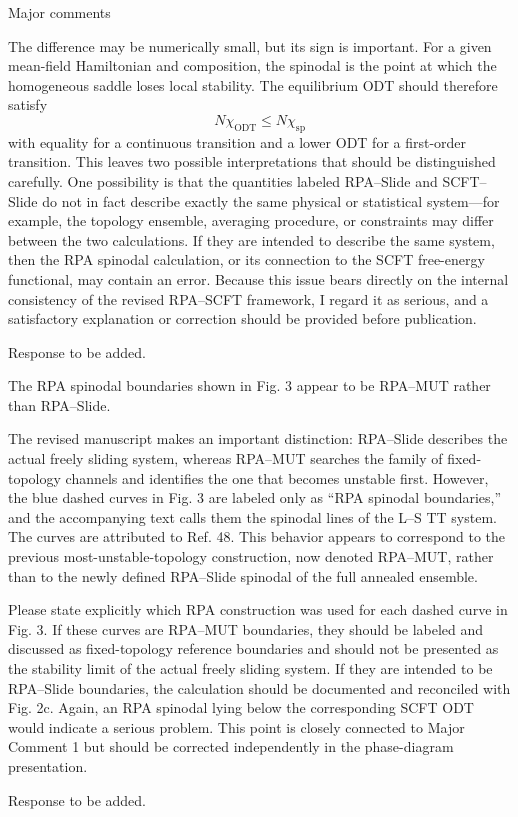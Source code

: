 \documentclass[../ResponsetoReviewers.tex]{subfiles}
\begin{document}
\begin{reviewersection}
\begin{reviewergroup}{Major comments}
\begin{qa}
    The difference may be numerically small, but its sign is important.
    For a given mean-field Hamiltonian and composition, the spinodal is the point at which the homogeneous saddle loses local stability.
    The equilibrium ODT should therefore satisfy
    \begin{equation*}
        N\chi_{\text{ODT}} \leq N\chi_{\text{sp}}
    \end{equation*}
    with equality for a continuous transition and a lower ODT for a first-order transition.
    This leaves two possible interpretations that should be distinguished carefully.
    One possibility is that the quantities labeled RPA–Slide and SCFT–Slide do not in fact describe exactly the same physical or statistical system—for example, the topology ensemble, averaging procedure, or constraints may differ between the two calculations.
    If they are intended to describe the same system, then the RPA spinodal calculation, or its connection to the SCFT free-energy functional, may contain an error.
    Because this issue bears directly on the internal consistency of the revised RPA–SCFT framework, I regard it as serious, and a satisfactory explanation or correction should be provided before publication.
\end{qa}
\begin{reply}
    Response to be added.
\end{reply}


\begin{qa}
    The RPA spinodal boundaries shown in Fig. 3 appear to be RPA–MUT rather than RPA–Slide.


    The revised manuscript makes an important distinction: RPA–Slide describes the actual freely sliding system, whereas RPA–MUT searches the family of fixed-topology channels and identifies the one that becomes unstable first.
    However, the blue dashed curves in Fig. 3 are labeled only as “RPA spinodal boundaries,” and the accompanying text calls them the spinodal lines of the L–S TT system.
    The curves are attributed to Ref. 48.
    This behavior appears to correspond to the previous most-unstable-topology construction, now denoted RPA–MUT, rather than to the newly defined RPA–Slide spinodal of the full annealed ensemble.


    Please state explicitly which RPA construction was used for each dashed curve in Fig. 3.
    If these curves are RPA–MUT boundaries, they should be labeled and discussed as fixed-topology reference boundaries and should not be presented as the stability limit of the actual freely sliding system.
    If they are intended to be RPA–Slide boundaries, the calculation should be documented and reconciled with Fig. 2c.
    Again, an RPA spinodal lying below the corresponding SCFT ODT would indicate a serious problem.
    This point is closely connected to Major Comment 1 but should be corrected independently in the phase-diagram presentation.
\end{qa}
\begin{reply}
    Response to be added.
\end{reply}


\end{reviewergroup}
\end{reviewersection}
\end{document}
